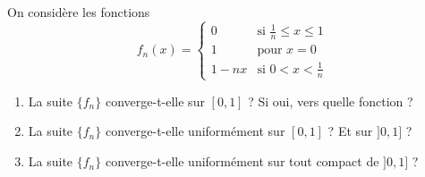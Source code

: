 

\begin{exercice}\label{exo112}

On considère les fonctions
\begin{equation}
	f_n(x)=
\begin{cases}
	0	&	\text{si }\frac{ 1 }{ n }\leq x\leq 1\\
	1	&	 \text{pour }x=0\\
	1-nx	&	 \text{si }0<x<\frac{ 1 }{ n }
\end{cases}
\end{equation}
\begin{enumerate}
\item La suite $\{f_n\}$ converge-t-elle sur $[0,1]$ ? Si oui, vers quelle fonction ?
\item La suite $\{ f_n \}$ converge-t-elle uniformément sur $[0,1]$ ? Et sur $]0,1]$ ?
\item La suite $\{ f_n \}$  converge-t-elle uniformément sur tout compact de $]0,1]$ ?
\end{enumerate}

\end{exercice}
